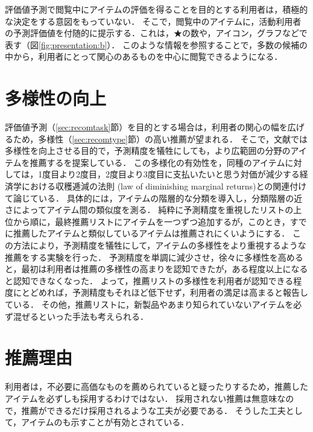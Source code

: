評価値予測で閲覧中にアイテムの評価を得ることを目的とする利用者は，積極的な決定をする意図をもっていない．
そこで，閲覧中のアイテムに，活動利用者の予測評価値を付随的に提示する．これは，★の数や，アイコン，グラフなどで表す（図\ref{fig:presentation:b}）．
このような情報を参照することで，多数の候補の中から，利用者にとって関心のあるものを中心に閲覧できるようになる．


\section{多様性の向上}
\label{sec:serendipity}

評価値予測（\ref{sec:recomtask}節）を目的とする場合は，利用者の関心の幅を広げるため，多様性（\ref{sec:recomtype}節）の高い推薦が望まれる．
そこで，文献\cite{www:05:01}では多様性を向上させる目的で，予測精度を犠牲にしても，より広範囲の分野のアイテムを推薦するを提案している．
この多様化の有効性を，同種のアイテムに対しては，1度目より2度目，2度目より3度目に支払いたいと思う対価が減少する経済学における収穫逓減の法則 (law of diminishing marginal returns)との関連付けて論じている．
具体的には，アイテムの階層的な分類を導入し，分類階層の近さによってアイテム間の類似度を測る．
純粋に予測精度を重視したリストの上位から順に，最終推薦リストにアイテムを一つずつ追加するが，このとき，すでに推薦したアイテムと類似しているアイテムは推薦されにくいようにする．
この方法により，予測精度を犠牲にして，アイテムの多様性をより重視するような推薦をする実験を行った．
予測精度を単調に減少させ，徐々に多様性を高めると，最初は利用者は推薦の多様性の高まりを認知できたが，ある程度以上になると認知できなくなった．
よって，推薦リストの多様性を利用者が認知できる程度にとどめれば，予測精度もそれほど低下せず，利用者の満足は高まると報告している．
その他，推薦リストに，新製品やあまり知られていないアイテムを必ず混ぜるといった手法も考えられる\cite{sigir:01:01}．

\section{推薦理由}
\label{sec:explanation}

利用者は，不必要に高価なものを薦められていると疑ったりするため，推薦したアイテムを必ずしも採用するわけではない．
採用されない推薦は無意味なので，推薦ができるだけ採用されるような工夫が必要である．
そうした工夫として，アイテムのも示すことが有効とされている．

